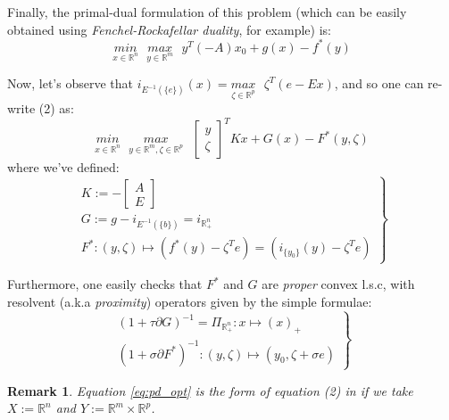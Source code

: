 \documentclass[a4paper,10pt,journal]{IEEEtran}
\newtheorem{remark}{Remark}
\begin{document}
Finally, the primal-dual formulation of this problem (which can be easily obtained using
\textit{Fenchel-Rockafellar duality}, for example) is:
\begin{equation}
  \underset{x \in \mathbb{R}^n}{min}\text{ }\underset{y \in \mathbb{R}^m}{max}\text{ }{y^T(-A)x_0 + g(x) - f^*(y)}
\end{equation}

Now, let's observe that $i_{E^{-1}(\{e\})}(x) = \underset{\zeta \in \mathbb{R}^p}{max}\text{ }\zeta^T(e - Ex)$, and so one can re-write (2) as:
\begin{equation}
  \underset{x \in \mathbb{R}^n}{min}\text{ }\underset{y \in \mathbb{R}^m, \zeta \in \mathbb{R}^p}{max}\text{ }
  \begin{bmatrix}y\\\zeta\end{bmatrix}^TKx + G(x) - F^*(y, \zeta)
  \label{eq:pd_opt}
\end{equation}
where we've defined:
\begin{equation}
  \left.
  \begin{aligned}
    K := -\begin{bmatrix}A\\E\end{bmatrix}\\
    G := g - i_{E^{-1}(\{b\})} = i_{\mathbb{R}_{+}^n}\\
    F^*: (y, \zeta) \mapsto (f^*(y) - \zeta^Te) = (i_{\{y_0\}}(y) - \zeta^Te)
  \end{aligned}
  \right\}
\end{equation}

Furthermore, one easily checks that $F^*$ and $G$ are \textit{proper} convex l.s.c, with resolvent
(a.k.a \textit{proximity}) operators given by the simple formulae:
\begin{equation}
  \left.
  \begin{aligned}
    (1 + \tau \partial G)^{-1} = \Pi_{\mathbb{R}_+^n}: x \mapsto (x)_+\\
    (1 + \sigma \partial F^*)^{-1}: (y, \zeta) \mapsto (y_0, \zeta + \sigma e)
  \end{aligned}
  \right\}
\end{equation}

\begin{remark}
Equation \eqref{eq:pd_opt} is the form of equation (2) in \cite{chambolle2010} if we take $X := \mathbb{R}^n$ and
$Y := \mathbb{R}^m \times \mathbb{R}^p$.
\end{remark}
\end{document}
